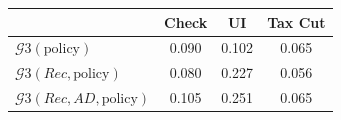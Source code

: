 \begin{tabular}{@{}lccc@{}} 
\toprule 
                          & Check      & UI    & Tax Cut    \\  \midrule 
$\mathcal{G}3(\text{policy})$ & 0.090  & 0.102  & 0.065     \\ 
$\mathcal{G}3(Rec,\text{policy})$ & 0.080  & 0.227  & 0.056     \\ 
$\mathcal{G}3(Rec, AD,\text{policy})$ & 0.105  & 0.251  & 0.065     \\ 
\end{tabular}  
